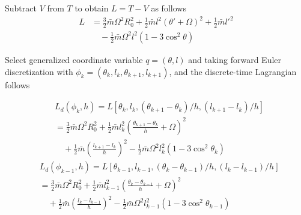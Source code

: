 \documentclass[10pt,onecolumn,draftcls]{IEEEtran}
\newcommand{\NPL}[1]{\newcounter{mytempeqncnt}
\begin{figure}[!t]
\normalsize
\setcounter{mytempeqncnt}{\value{equation}}
\setcounter{equation}{#1}}
\begin{document}
	Subtract $V$ from $T$ to obtain $L=T-V$ as follows 
	\begin{align*}
		L&=\frac{3}{2}\bar m\Omega^2R_0^2+\frac{1}{2}\bar{m}l^2(\theta'+\Omega)^2+\frac{1}{2}\bar{m}l'^2\\
		&\quad-\frac{1}{2}\bar{m}\Omega^2l^2(1-3\cos^2\theta)
	\end{align*}

	Select generalized coordinate variable $q=(\theta,l)$ and taking forward Euler discretization with $\phi_k=(\theta_k,l_k,\theta_{k+1},l_{k+1})$, and the discrete-time Lagrangian follows

  \begin{align*}
	&L_d(\phi_k,h)=L\left[\theta_k,l_k,(\theta_{k+1}-\theta_{k})/h,(l_{k+1}-l_{k})/h\right]\\
		&=\frac{3}{2}\bar m\Omega^2R_0^2+\frac{1}{2}\bar{m}l_k^2\left(\frac{\theta_{k+1}-\theta_k}{h}+\Omega\right)^2\\
		&\quad+\frac{1}{2}\bar{m}\left(\frac{l_{k+1}-l_k}{h}\right)^2-\frac{1}{2}\bar{m}\Omega^2l_k^2(1-3\cos^2\theta_k)
	\end{align*}\begin{align*}
			&L_d(\phi_{k-1},h)=L\left[\theta_{k-1},l_{k-1},(\theta_{k}-\theta_{k-1})/h,(l_{k}-l_{k-1})/h\right]\\
		&=\frac{3}{2}\bar m\Omega^2R_0^2+\frac{1}{2}\bar{m}l_{k-1}^2\left(\frac{\theta_{k}-\theta_{k-1}}{h}+\Omega\right)^2\\
		&\quad+\frac{1}{2}\bar{m}\left(\frac{l_{k}-l_{k-1}}{h}\right)^2-\frac{1}{2}\bar{m}\Omega^2l_{k-1}^2(1-3\cos^2\theta_{k-1})
  \end{align*}
 
\end{document}
